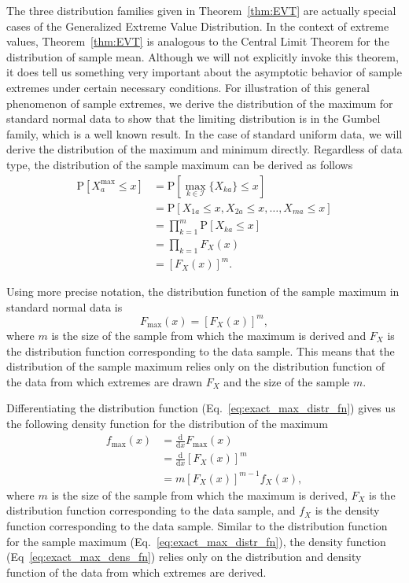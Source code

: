 \documentclass[aos]{imsart}
\begin{document}
The three distribution families given in Theorem~\ref{thm:EVT} are actually special cases of the Generalized Extreme Value Distribution. In the context of extreme values, Theorem~\ref{thm:EVT} is analogous to the Central Limit Theorem for the distribution of sample mean.  Although we will not explicitly invoke this theorem, it does tell us something very important about the asymptotic behavior of sample extremes under certain necessary conditions. For illustration of this general phenomenon of sample extremes, we derive the distribution of the maximum for standard normal data to show that the limiting distribution is in the Gumbel family, which is a well known result. In the case of standard uniform data, we will derive the distribution of the maximum and minimum directly. Regardless of data type, the distribution of the sample maximum can be derived as follows
%
\begin{equation}\label{eq:exact_max}
\begin{aligned}
\text{P}[X^\text{max}_a \leq x] &= \text{P}\left[\max_{k \in \mathcal{I}}\{X_{ka}\} \leq x\right] \\
&= \text{P}[X_{1a} \leq x, X_{2a} \leq x, \dots, X_{ma} \leq x] \\
&= \prod_{k = 1}^{m} \text{P}[X_{ka} \leq x] \\
&= \prod_{k=1} F_X(x) \\
&= [F_X(x)]^m.
\end{aligned}
\end{equation}

Using more precise notation, the distribution function of the sample maximum in standard normal data is
%
\begin{equation}\label{eq:exact_max_distr_fn}
F_\text{max}(x) = [F_X(x)]^m,
\end{equation}
%
where $m$ is the size of the sample from which the maximum is derived and $F_X$ is the distribution function corresponding to the data sample. This means that the distribution of the sample maximum relies only on the distribution function of the data from which extremes are drawn $F_X$ and the size of the sample $m$.

Differentiating the distribution function (Eq.~\ref{eq:exact_max_distr_fn}) gives us the following density function for the distribution of the maximum
%
\begin{equation}\label{eq:exact_max_dens_fn}
\begin{aligned}
f_\text{max}(x) &= \frac{\text{d}}{\text{d}x} F_\text{max}(x) \\
&= \frac{\text{d}}{\text{d}x} [F_X(x)]^m \\
&= m [F_X(x)]^{m-1} f_X(x),
\end{aligned}
\end{equation}
%
where $m$ is the size of the sample from which the maximum is derived, $F_X$ is the distribution function corresponding to the data sample, and $f_X$ is the density function corresponding to the data sample. Similar to the distribution function for the sample maximum (Eq.~\ref{eq:exact_max_distr_fn}), the density function (Eq~\ref{eq:exact_max_dens_fn}) relies only on the distribution and density function of the data from which extremes are derived.
\end{document}
